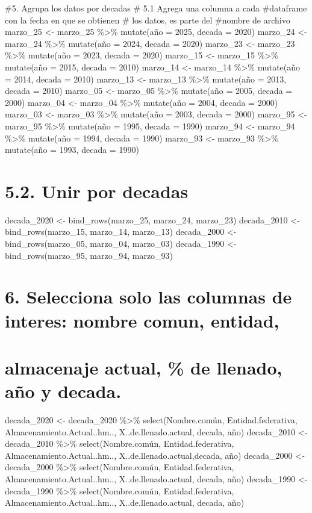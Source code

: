 \documentclass[
]{article}
\begin{document}
\#5. Agrupa los datos por decadas \# 5.1 Agrega una columna a cada
\#dataframe con la fecha en que se obtienen \# los datos, es parte del
\#nombre de archivo marzo\_25 \textless- marzo\_25 \%\textgreater\%
mutate(año = 2025, decada = 2020) marzo\_24 \textless- marzo\_24
\%\textgreater\% mutate(año = 2024, decada = 2020) marzo\_23 \textless-
marzo\_23 \%\textgreater\% mutate(año = 2023, decada = 2020) marzo\_15
\textless- marzo\_15 \%\textgreater\% mutate(año = 2015, decada = 2010)
marzo\_14 \textless- marzo\_14 \%\textgreater\% mutate(año = 2014,
decada = 2010) marzo\_13 \textless- marzo\_13 \%\textgreater\%
mutate(año = 2013, decada = 2010) marzo\_05 \textless- marzo\_05
\%\textgreater\% mutate(año = 2005, decada = 2000) marzo\_04 \textless-
marzo\_04 \%\textgreater\% mutate(año = 2004, decada = 2000) marzo\_03
\textless- marzo\_03 \%\textgreater\% mutate(año = 2003, decada = 2000)
marzo\_95 \textless- marzo\_95 \%\textgreater\% mutate(año = 1995,
decada = 1990) marzo\_94 \textless- marzo\_94 \%\textgreater\%
mutate(año = 1994, decada = 1990) marzo\_93 \textless- marzo\_93
\%\textgreater\% mutate(año = 1993, decada = 1990)

\section{5.2. Unir por decadas}\label{unir-por-decadas}

decada\_2020 \textless- bind\_rows(marzo\_25, marzo\_24, marzo\_23)
decada\_2010 \textless- bind\_rows(marzo\_15, marzo\_14, marzo\_13)
decada\_2000 \textless- bind\_rows(marzo\_05, marzo\_04, marzo\_03)
decada\_1990 \textless- bind\_rows(marzo\_95, marzo\_94, marzo\_93)

\section{6. Selecciona solo las columnas de interes: nombre comun,
entidad,}\label{selecciona-solo-las-columnas-de-interes-nombre-comun-entidad}

\section{almacenaje actual, \% de llenado, año y
decada.}\label{almacenaje-actual-de-llenado-auxf1o-y-decada.}

decada\_2020 \textless- decada\_2020 \%\textgreater\%
select(Nombre.común, Entidad.federativa, Almacenamiento.Actual..hm..,
X..de.llenado.actual, decada, año) decada\_2010 \textless- decada\_2010
\%\textgreater\% select(Nombre.común, Entidad.federativa,
Almacenamiento.Actual..hm.., X..de.llenado.actual,decada, año)
decada\_2000 \textless- decada\_2000 \%\textgreater\%
select(Nombre.común, Entidad.federativa, Almacenamiento.Actual..hm..,
X..de.llenado.actual, decada, año) decada\_1990 \textless- decada\_1990
\%\textgreater\% select(Nombre.común, Entidad.federativa,
Almacenamiento.Actual..hm.., X..de.llenado.actual, decada, año)
\end{document}
